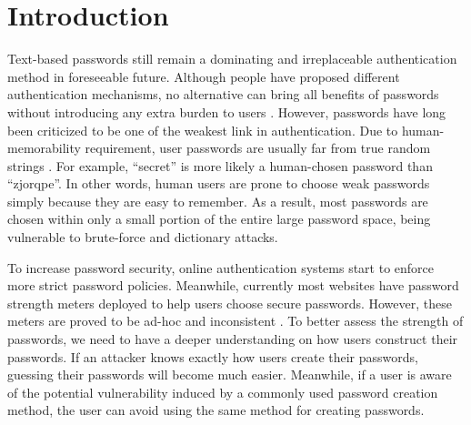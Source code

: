 
\section{Introduction}
Text-based passwords still remain a dominating and irreplaceable
authentication method in foreseeable future. Although people have
proposed different authentication mechanisms, no alternative can bring
all benefits of passwords without introducing any extra burden to
users \cite{bonneau2012quest}. However, passwords have long been
criticized to be one of the weakest link in authentication.  Due to
human-memorability requirement, user passwords are usually far from
true random strings
\cite{bonneau2012science,malone2012investigating,narayanan2005fast,veras2012visualizing,yan2004password}. For
example, ``secret'' is more likely a human-chosen password than
``zjorqpe''. In other words, human users are prone to choose weak
passwords simply because they are easy to remember.  As a result, most
passwords are chosen within only a small portion of the entire large
password space, being vulnerable to brute-force and dictionary attacks.



To increase password security, online authentication systems start to
enforce more strict password policies. Meanwhile, currently most
websites have password strength meters deployed to help users choose
secure passwords. However, these meters are proved to be ad-hoc and
inconsistent \cite{de2014very}. To better assess the strength of
passwords, we need to have a deeper understanding on how users
construct their passwords. If an attacker knows exactly how users
create their passwords, guessing their passwords will become much
easier. Meanwhile, if a user is aware of the potential vulnerability
induced by a commonly used password creation method, the user can
avoid using the same method for creating passwords.


